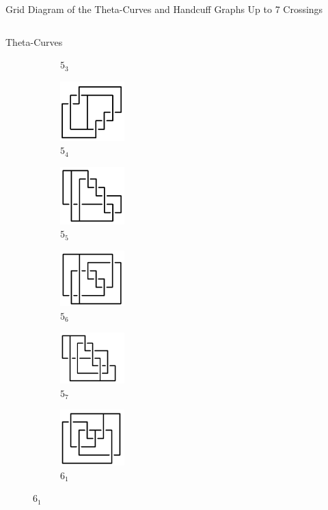 \documentclass[final]{beamer}
\begin{document}
\begin{frame}[t]
\begin{alertblock}{Grid Diagram of the Theta-Curves and Handcuff Graphs Up to 7 Crossings}
\begin{columns}[t]
\begin{column}{0.7\textwidth}
\begin{alertblock}{Theta-Curves}
\begin{figure}
\begin{subfigure}{0.075\textwidth}
    \caption{$5_3$}
    \end{subfigure}
    \begin{subfigure}{0.075\textwidth}
    \includegraphics[width=2.5cm]{../Midterm_Poster/grid_diagram/theta_5_4.png}
    \caption{$5_4$} 
    \end{subfigure}
    \begin{subfigure}{0.075\textwidth}
    \includegraphics[width=2.5cm]{../Midterm_Poster/grid_diagram/theta_5_5.png}
    \caption{$5_5$} 
    \end{subfigure}
    \begin{subfigure}{0.075\textwidth}
    \includegraphics[width=2.5cm]{../Midterm_Poster/grid_diagram/theta_5_6.png}
    \caption{$5_6$} 
    \end{subfigure}
    \begin{subfigure}{0.075\textwidth}
    \includegraphics[width=2.5cm]{../Midterm_Poster/grid_diagram/theta_5_7.png}
    \caption{$5_7$} 
    \end{subfigure}
    \begin{subfigure}{0.075\textwidth}
    \includegraphics[width=2.5cm]{../Midterm_Poster/grid_diagram/theta_6_1.png}
    \caption{$6_1$} 
    \end{subfigure}

\end{figure}
\end{alertblock}
\end{column}
\end{columns}
\end{alertblock}
\end{frame}
\end{document}
